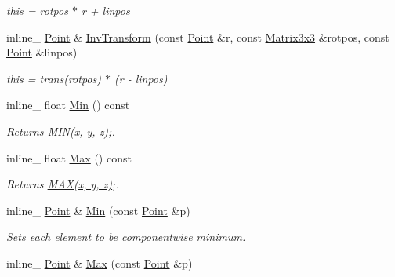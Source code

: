\begin{DoxyCompactItemize}
\begin{DoxyCompactList}\small\item\em this = rotpos $\ast$ r + linpos \end{DoxyCompactList}\item 
inline\+\_\+ \hyperlink{classPoint}{Point} \& \hyperlink{classPoint_a4617e15a45ae8868dae8aad1fe9ad600}{Inv\+Transform} (const \hyperlink{classPoint}{Point} \&r, const \hyperlink{classMatrix3x3}{Matrix3x3} \&rotpos, const \hyperlink{classPoint}{Point} \&linpos)\hypertarget{classPoint_a4617e15a45ae8868dae8aad1fe9ad600}{}\label{classPoint_a4617e15a45ae8868dae8aad1fe9ad600}

\begin{DoxyCompactList}\small\item\em this = trans(rotpos) $\ast$ (r -\/ linpos) \end{DoxyCompactList}\item 
inline\+\_\+ float \hyperlink{classPoint_ad493dd5f754f87a2b7e25e5b150545ac}{Min} () const \hypertarget{classPoint_ad493dd5f754f87a2b7e25e5b150545ac}{}\label{classPoint_ad493dd5f754f87a2b7e25e5b150545ac}

\begin{DoxyCompactList}\small\item\em Returns \hyperlink{IceTypes_8h_a3acffbd305ee72dcd4593c0d8af64a4f}{M\+I\+N(x, y, z)};. \end{DoxyCompactList}\item 
inline\+\_\+ float \hyperlink{classPoint_a1ee0959084fad2caec2cc7c6ff42487c}{Max} () const \hypertarget{classPoint_a1ee0959084fad2caec2cc7c6ff42487c}{}\label{classPoint_a1ee0959084fad2caec2cc7c6ff42487c}

\begin{DoxyCompactList}\small\item\em Returns \hyperlink{IceTypes_8h_afa99ec4acc4ecb2dc3c2d05da15d0e3f}{M\+A\+X(x, y, z)};. \end{DoxyCompactList}\item 
inline\+\_\+ \hyperlink{classPoint}{Point} \& \hyperlink{classPoint_a893606605537aece9dc35adf1d915c60}{Min} (const \hyperlink{classPoint}{Point} \&p)\hypertarget{classPoint_a893606605537aece9dc35adf1d915c60}{}\label{classPoint_a893606605537aece9dc35adf1d915c60}

\begin{DoxyCompactList}\small\item\em Sets each element to be componentwise minimum. \end{DoxyCompactList}\item 
inline\+\_\+ \hyperlink{classPoint}{Point} \& \hyperlink{classPoint_a2d35ee239413a2680be0a34927bc18da}{Max} (const \hyperlink{classPoint}{Point} \&p)\hypertarget{classPoint_a2d35ee239413a2680be0a34927bc18da}{}\label{classPoint_a2d35ee239413a2680be0a34927bc18da}


\end{DoxyCompactItemize}
